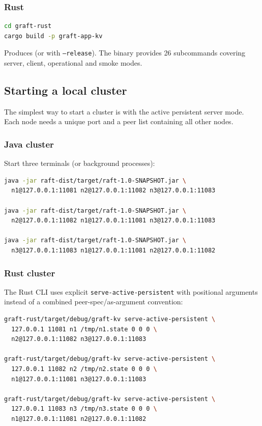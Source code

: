 \subsubsection{Rust}

\begin{lstlisting}[language=bash,caption={Rust build}]
cd graft-rust
cargo build -p graft-app-kv
\end{lstlisting}

Produces  (or
 with \texttt{--release}). The binary
provides 26 subcommands covering server, client, operational and smoke modes.

\subsection{Starting a local cluster}

The simplest way to start a cluster is with the active persistent server mode.
Each node needs a unique port and a peer list containing all other nodes.

\subsubsection{Java cluster}

Start three terminals (or background processes):

\begin{lstlisting}[language=bash,caption={Java 3-node cluster}]
java -jar raft-dist/target/raft-1.0-SNAPSHOT.jar \
  n1@127.0.0.1:11081 n2@127.0.0.1:11082 n3@127.0.0.1:11083

java -jar raft-dist/target/raft-1.0-SNAPSHOT.jar \
  n2@127.0.0.1:11082 n1@127.0.0.1:11081 n3@127.0.0.1:11083

java -jar raft-dist/target/raft-1.0-SNAPSHOT.jar \
  n3@127.0.0.1:11083 n1@127.0.0.1:11081 n2@127.0.0.1:11082
\end{lstlisting}

\subsubsection{Rust cluster}

The Rust CLI uses explicit \texttt{serve-active-persistent} with positional
arguments instead of a combined peer-spec/as-argument convention:

\begin{lstlisting}[language=bash,caption={Rust 3-node cluster}]
graft-rust/target/debug/graft-kv serve-active-persistent \
  127.0.0.1 11081 n1 /tmp/n1.state 0 0 0 \
  n2@127.0.0.1:11082 n3@127.0.0.1:11083

graft-rust/target/debug/graft-kv serve-active-persistent \
  127.0.0.1 11082 n2 /tmp/n2.state 0 0 0 \
  n1@127.0.0.1:11081 n3@127.0.0.1:11083

graft-rust/target/debug/graft-kv serve-active-persistent \
  127.0.0.1 11083 n3 /tmp/n3.state 0 0 0 \
  n1@127.0.0.1:11081 n2@127.0.0.1:11082
\end{lstlisting}

